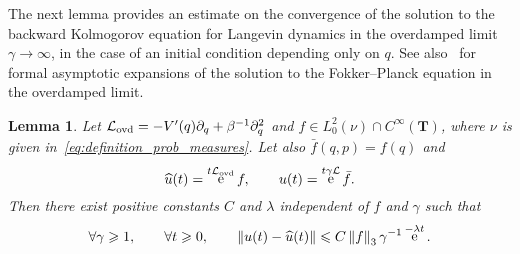 \documentclass[11pt,a4paper]{article}
\DeclareMathOperator{\e}{e}
\newcommand{\torus}{\mathbf T}
\theoremstyle{plain}
\newtheorem{lemma}{Lemma}[section]
\numberwithin{equation}{section}
\renewcommand{\leq}{\leqslant}
\renewcommand{\geq}{\geqslant}
\begin{document}
The next lemma provides an estimate on the convergence of the solution to the backward Kolmogorov equation for Langevin dynamics
in the overdamped limit $\gamma \to \infty$,
in the case of an initial condition depending only on $q$.
See also~\cite{MR496218,MR918689} for formal asymptotic expansions of the solution to the Fokker--Planck equation in the overdamped limit.

\begin{lemma}
    \label{lemma:backward_kolmogorov_obs_q}
    Let $\mathcal L_{\rm ovd} = - V'(q) \partial_q + \beta^{-1} \partial_q^2$ and $f \in L^2_0(\nu) \cap C^{\infty}(\torus)$,
    where $\nu$ is given in~\eqref{eq:definition_prob_measures}.
    Let also $\bar f(q, p) = f(q)$ and
    \[
        \widehat u(t) = \e^{t\mathcal L_{\rm ovd}} f, \qquad
        u(t) = \e^{t \gamma\mathcal L} \bar f.
    \]
    Then there exist positive constants $C$ and $\lambda$ independent of $f$ and $\gamma$ such that
    \[
        \forall \gamma \geq 1, \qquad
        \forall t \geq 0, \qquad
        \norm{u(t)  - \widehat u(t)} \leq
        C \norm{f}_3 \gamma^{-1} \e^{-\lambda t}.
    \]
\end{lemma}
\end{document}
